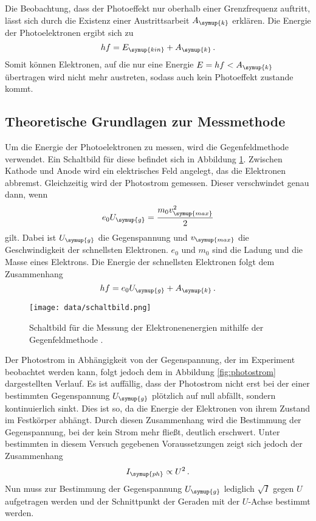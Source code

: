 Die Beobachtung, dass der Photoeffekt nur oberhalb einer Grenzfrequenz auftritt, lässt sich
durch die Existenz einer Austrittsarbeit $A_{\symup{k}}$ erklären. Die Energie der
Photoelektronen ergibt sich zu
\begin{equation}
  h f= E_{\symup{kin}}+A_{\symup{k}} \,.
\end{equation}
Somit können Elektronen, auf die nur eine Energie $E=hf<A_{\symup{k}}$ übertragen wird
nicht mehr austreten, sodass auch kein Photoeffekt zustande kommt.

\subsection{Theoretische Grundlagen zur Messmethode}
\label{subsec:Theorie_Messung}

Um die Energie der Photoelektronen zu messen, wird die Gegenfeldmethode verwendet. Ein
Schaltbild für diese befindet sich in Abbildung \ref{fig:schaltbild}. Zwischen
Kathode und Anode wird ein elektrisches Feld angelegt, das die Elektronen abbremst.
Gleichzeitig wird der Photostrom gemessen. Dieser verschwindet genau dann, wenn
\begin{equation}
  e_0 U_{\symup{g}}=\frac{m_0 v_{\symup{max}}^2}{2}
\end{equation}
gilt. Dabei ist $U_{\symup{g}}$ die Gegenspannung und $v_{\symup{max}}$ die
Geschwindigkeit der schnellsten Elektronen. $e_0$ und $m_0$ sind die Ladung und die
Masse eines Elektrons. Die Energie der schnellsten Elektronen folgt dem Zusammenhang
\begin{equation}
  h f=e_0 U_{\symup{g}} + A_{\symup{k}} \,.
\end{equation}

\begin{figure}
  \centering
  \texttt{[image: data/schaltbild.png]}
  \caption{Schaltbild für die Messung der Elektronenenergien mithilfe der Gegenfeldmethode \cite{Versuchsanleitung}.}
  \label{fig:schaltbild}
\end{figure}

Der Photostrom in Abhängigkeit von der Gegenspannung, der im Experiment beobachtet werden kann,
folgt jedoch dem in Abbildung \ref{fig:photostrom} dargestellten Verlauf. Es ist
auffällig, dass der Photostrom nicht erst bei der einer bestimmten Gegenspannung $U_{\symup{g}}$
plötzlich auf null abfällt, sondern kontinuierlich sinkt. Dies ist so, da die Energie der
Elektronen von ihrem Zustand im Festkörper abhängt. Durch diesen Zusammenhang wird die
Bestimmung der Gegenspannung, bei der kein Strom mehr fließt, deutlich erschwert.
Unter bestimmten in diesem Versuch gegebenen Voraussetzungen zeigt sich jedoch der
Zusammenhang
\begin{equation}
  I_{\symup{ph}} \propto U^2 \,.
\end{equation}
Nun muss zur Bestimmung der Gegenspannung $U_{\symup{g}}$ lediglich $\sqrt{I}$ gegen
$U$ aufgetragen werden und der Schnittpunkt der Geraden mit der $U$-Achse bestimmt werden.

